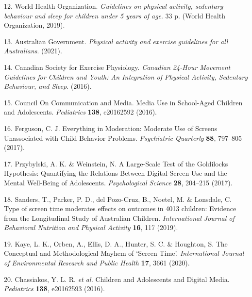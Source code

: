\documentclass[
  english,
  man]{apa6}
\newenvironment{cslreferences}%
  {}%
  {\par}
\begin{document}
\begin{cslreferences}
\leavevmode\hypertarget{ref-whoGuidelinesPhysicalActivity2019}{}%
12. World Health Organization. \emph{Guidelines on physical activity, sedentary behaviour and sleep for children under 5 years of age}. 33 p. (World Health Organization, 2019).

\leavevmode\hypertarget{ref-australiangovernmentPhysicalActivityExercise2021}{}%
13. Australian Government. \emph{Physical activity and exercise guidelines for all Australians}. (2021).

\leavevmode\hypertarget{ref-Canadian24HourMovement2016}{}%
14. Canadian Society for Exercise Physiology. \emph{Canadian 24-Hour Movement Guidelines for Children and Youth: An Integration of Physical Activity, Sedentary Behaviour, and Sleep}. (2016).

\leavevmode\hypertarget{ref-AAPMediaUseSchoolAged2016}{}%
15. Council On Communication and Media. Media Use in School-Aged Children and Adolescents. \emph{Pediatrics} \textbf{138}, e20162592 (2016).

\leavevmode\hypertarget{ref-fergusonEverythingModerationModerate2017}{}%
16. Ferguson, C. J. Everything in Moderation: Moderate Use of Screens Unassociated with Child Behavior Problems. \emph{Psychiatric Quarterly} \textbf{88}, 797--805 (2017).

\leavevmode\hypertarget{ref-przybylskiLargeScaleTestGoldilocks2017}{}%
17. Przybylski, A. K. \& Weinstein, N. A Large-Scale Test of the Goldilocks Hypothesis: Quantifying the Relations Between Digital-Screen Use and the Mental Well-Being of Adolescents. \emph{Psychological Science} \textbf{28}, 204--215 (2017).

\leavevmode\hypertarget{ref-sandersTypeScreenTime2019}{}%
18. Sanders, T., Parker, P. D., del Pozo-Cruz, B., Noetel, M. \& Lonsdale, C. Type of screen time moderates effects on outcomes in 4013 children: Evidence from the Longitudinal Study of Australian Children. \emph{International Journal of Behavioral Nutrition and Physical Activity} \textbf{16}, 117 (2019).

\leavevmode\hypertarget{ref-kayeConceptualMethodologicalMayhem2020}{}%
19. Kaye, L. K., Orben, A., Ellis, D. A., Hunter, S. C. \& Houghton, S. The Conceptual and Methodological Mayhem of `Screen Time'. \emph{International Journal of Environmental Research and Public Health} \textbf{17}, 3661 (2020).

\leavevmode\hypertarget{ref-chassiakosChildrenAdolescentsDigital2016}{}%
20. Chassiakos, Y. L. R. \emph{et al.} Children and Adolescents and Digital Media. \emph{Pediatrics} \textbf{138}, e20162593 (2016).


\end{cslreferences}
\end{document}
